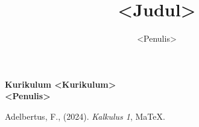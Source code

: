 \documentclass{article}
\title{<Judul>}
\author{<Penulis>}
\date{}
\begin{document}
\begin{center}
    \textbf{}

    \vspace{0.5cm}
    \textbf{\Large Kurikulum <Kurikulum>}\\
    \vspace{0.5cm}
    \textbf{\Large <Penulis>}

    \vspace{7cm}
\end{center}
\thispagestyle{empty}

\newpage
\tableofcontents


















\begin{thebibliography}{9}
Adelbertus, F., (2024). \emph{Kalkulus 1}, MaTeX.
\end{thebibliography}
\end{document}
